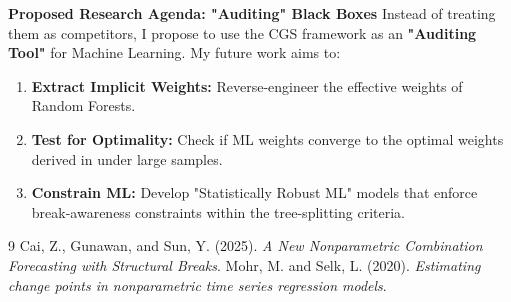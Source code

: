 \documentclass[11pt, a4paper]{article}
\begin{document}
\noindent \textbf{Proposed Research Agenda: "Auditing" Black Boxes}
Instead of treating them as competitors, I propose to use the CGS framework as an \textbf{"Auditing Tool"} for Machine Learning. My future work aims to:
\begin{enumerate}
    \item \textbf{Extract Implicit Weights:} Reverse-engineer the effective weights of Random Forests.
    \item \textbf{Test for Optimality:} Check if ML weights converge to the optimal weights derived in under large samples.
    \item \textbf{Constrain ML:} Develop "Statistically Robust ML" models that enforce break-awareness constraints within the tree-splitting criteria.
\end{enumerate}

\begin{thebibliography}{9}
\small
{} Cai, Z., Gunawan, and Sun, Y. (2025). \textit{A New Nonparametric Combination Forecasting with Structural Breaks}.
 Mohr, M. and Selk, L. (2020). \textit{Estimating change points in nonparametric time series regression models}.
\end{thebibliography}
\end{document}
